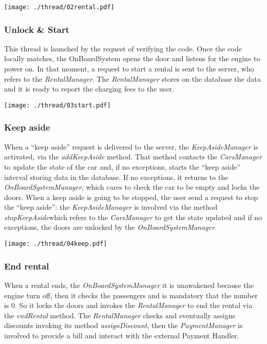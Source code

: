 \documentclass{scrreprt}
\begin{document}
\begin{center}
		\texttt{[image: ./thread/02rental.pdf]}
\end{center}

\subsubsection{Unlock \& Start}
This thread is launched by the request of verifying the code. Once the code locally matches, the OnBoardSystem opens the door and listens for the engine to power on. In that moment, a request to start a rental is sent to the server, who refers to the \emph{RentalManager}. The \emph{RentalManager} stores on the database the data and it is ready to report the charging fees to the user.

\begin{center}
		\texttt{[image: ./thread/03start.pdf]}
\end{center}

\subsubsection{Keep aside}
When a ``keep aside'' request is delivered to the server, the \emph{KeepAsideManager} is activated, via the \emph{addKeepAside} method. That method contacts the \emph{CarsManager} to update the state of the car and, if no exceptions, starts the ``keep aside'' interval storing data in the database. If no exceptions, it returns to the \emph{OnBoardSystemManager}, which cares to check the car to be empty and locks the doors.
When a keep aside is going to be stopped, the user send a request to stop the ``keep aside'': the \emph{KeepAsideManager} is involved via the method \emph{stopKeepAside}which refers to the \emph{CarsManager} to get the state updated and if no exceptions, the doors are unlocked by the \emph{OnBoardSystemManager}.

\begin{center}
		\texttt{[image: ./thread/04keep.pdf]}
\end{center}

\subsubsection{End rental}
When a rental ends, the \emph{OnBoardSystemManager} it is unawakened because the engine turn off, then it checks the passengers and is mandatory that the number is 0. So it locks the doors and invokes the \emph{RentalManager} to end the rental via the \emph{endRental} method. The \emph{RentalManager} checks and eventually assigns discounts invoking its method \emph{assignDiscount}, then the \emph{PaymentManager} is involved to provide a bill and interact with the external Payment Handler.
\end{document}
